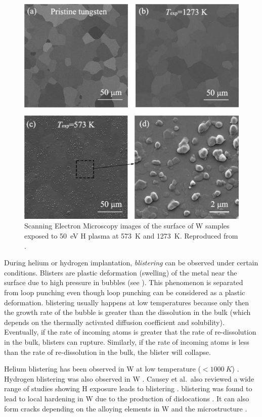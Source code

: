 \begin{figure}
    \centering
    \includegraphics[width=\linewidth]{Figures/Chapter1/h_blisters_in_tungsten.jpg}
    \caption{Scanning Electron Microscopy images of the surface of W samples exposed to \SI{50}{eV} H plasma at \SI{573}{K} and \SI{1273}{K}. Reproduced from \cite{chen_irradiation_2019}.}
\end{figure}

During helium or hydrogen implantation, \emph{\gls{blistering}} can be observed under certain conditions.
Blisters are plastic deformation (swelling) of the metal near the surface due to high pressure in bubbles (see ).
This phenomenon is separated from \gls{loop punching} even though \gls{loop punching} can be considered as a plastic deformation.
\Gls{blistering} usually happens at low temperatures because only then the growth rate of the bubble is greater than the dissolution in the bulk (which depends on the thermally activated diffusion coefficient and solubility).
Eventually, if the rate of incoming atoms is greater that the rate of re-dissolution in the bulk, blisters can rupture.
Similarly, if the rate of incoming atoms is less than the rate of re-dissolution in the bulk, the blister will collapse.

Helium \gls{blistering} has been observed in \gls{W} at low temperature ($< \SI{1000}{K}$) .
Hydrogen \gls{blistering} was also observed in \gls{W} .
Causey et al.\ also reviewed a wide range of studies showing H exposure leads to \gls{blistering} .
\Gls{blistering} was found to lead to local hardening in \gls{W} due to the production of dislocations .
It can also form cracks depending on the alloying elements in \gls{W} and the microstructure .

